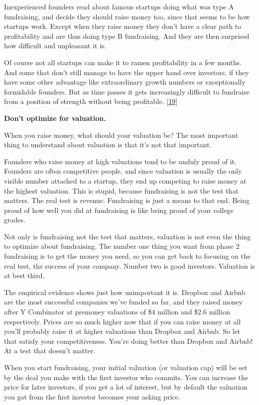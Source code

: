 Inexperienced founders read about famous startups doing what was type A
fundraising, and decide they should raise money too, since that seems to
be how startups work. Except when they raise money they don't have a
clear path to profitability and are thus doing type B fundraising. And
they are then surprised how difficult and unpleasant it is.

Of course not all startups can make it to ramen profitability in a few
months. And some that don't still manage to have the upper hand over
investors, if they have some other advantage like extraordinary growth
numbers or exceptionally formidable founders. But as time passes it gets
increasingly difficult to fundraise from a position of strength without
being profitable. {[}\hyperref[f19n]{19}{]}

\textbf{Don't optimize for valuation.}

When you raise money, what should your valuation be? The most important
thing to understand about valuation is that it's not that important.

Founders who raise money at high valuations tend to be unduly proud of
it. Founders are often competitive people, and since valuation is
usually the only visible number attached to a startup, they end up
competing to raise money at the highest valuation. This is stupid,
because fundraising is not the test that matters. The real test is
revenue. Fundraising is just a means to that end. Being proud of how
well you did at fundraising is like being proud of your college grades.

Not only is fundraising not the test that matters, valuation is not even
the thing to optimize about fundraising. The number one thing you want
from phase 2 fundraising is to get the money you need, so you can get
back to focusing on the real test, the success of your company. Number
two is good investors. Valuation is at best third.

The empirical evidence shows just how unimportant it is. Dropbox and
Airbnb are the most successful companies we've funded so far, and they
raised money after Y Combinator at premoney valuations of \$4 million
and \$2.6 million respectively. Prices are so much higher now that if
you can raise money at all you'll probably raise it at higher valuations
than Dropbox and Airbnb. So let that satisfy your competitiveness.
You're doing better than Dropbox and Airbnb! At a test that doesn't
matter.

When you start fundraising, your initial valuation (or valuation cap)
will be set by the deal you make with the first investor who commits.
You can increase the price for later investors, if you get a lot of
interest, but by default the valuation you got from the first investor
becomes your asking price.

